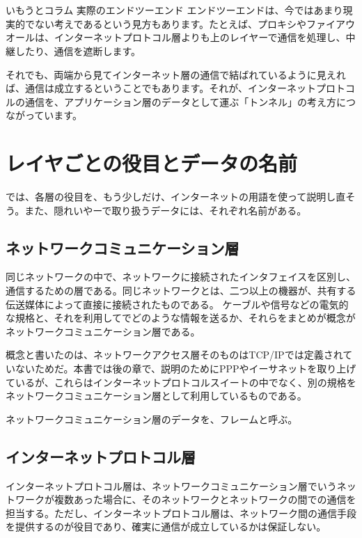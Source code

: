 \section*{}
\begin{itembox}[l]{いもうとコラム 実際のエンドツーエンド}
エンドツーエンドは、今ではあまり現実的でない考えであるという見方もあります。たとえば、プロキシやファイアウオールは、インターネットプロトコル層よりも上のレイヤーで通信を処理し、中継したり、通信を遮断します。

それでも、両端から見てインターネット層の通信で結ばれているように見えれば、通信は成立するということでもあります。それが、インターネットプロトコルの通信を、アプリケーション層のデータとして運ぶ「トンネル」の考え方につながっています。


\end{itembox}


\section{レイヤごとの役目とデータの名前}
では、各層の役目を、もう少しだけ、インターネットの用語を使って説明し直そう。また、隠れいやーで取り扱うデータには、それぞれ名前がある。

\subsection{ネットワークコミュニケーション層}
同じネットワークの中で、ネットワークに接続されたインタフェイスを区別し、通信するための層である。同じネットワークとは、二つ以上の機器が、共有する伝送媒体によって直接に接続されたものである。
ケーブルや信号などの電気的な規格と、それを利用してでどのような情報を送るか、それらをまとめが概念がネットワークコミュニケーション層である。

概念と書いたのは、ネットワークアクセス層そのものはTCP/IPでは定義されていないためだ。本書では後の章で、説明のためにPPPやイーサネットを取り上げているが、これらはインターネットプロトコルスイートの中でなく、別の規格をネットワークコミュニケーション層として利用しているものである。

ネットワークコミュニケーション層のデータを、フレームと呼ぶ。

\subsection{インターネットプロトコル層}
インターネットプロトコル層は、ネットワークコミュニケーション層でいうネットワークが複数あった場合に、そのネットワークとネットワークの間での通信を担当する。ただし、インターネットプロトコル層は、ネットワーク間の通信手段を提供するのが役目であり、確実に通信が成立しているかは保証しない。

